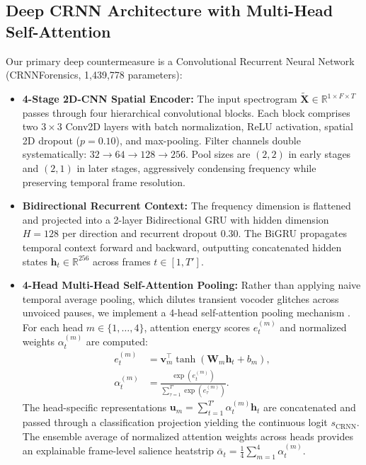 \documentclass[conference]{IEEEtran}
\begin{document}
\subsection{Deep CRNN Architecture with Multi-Head Self-Attention}
Our primary deep countermeasure is a Convolutional Recurrent Neural Network (CRNNForensics, 1,439,778 parameters):
\begin{itemize}
    \item \textbf{4-Stage 2D-CNN Spatial Encoder:} The input spectrogram $\tilde{\mathbf{X}} \in \mathbb{R}^{1 \times F \times T}$ passes through four hierarchical convolutional blocks. Each block comprises two $3 \times 3$ Conv2D layers with batch normalization, ReLU activation, spatial 2D dropout ($p=0.10$), and max-pooling. Filter channels double systematically: $32 \rightarrow 64 \rightarrow 128 \rightarrow 256$. Pool sizes are $(2, 2)$ in early stages and $(2, 1)$ in later stages, aggressively condensing frequency while preserving temporal frame resolution.
    \item \textbf{Bidirectional Recurrent Context:} The frequency dimension is flattened and projected into a 2-layer Bidirectional GRU with hidden dimension $H = 128$ per direction and recurrent dropout $0.30$. The BiGRU propagates temporal context forward and backward, outputting concatenated hidden states $\mathbf{h}_t \in \mathbb{R}^{256}$ across frames $t \in [1, T']$.
    \item \textbf{4-Head Multi-Head Self-Attention Pooling:} Rather than applying naive temporal average pooling, which dilutes transient vocoder glitches across unvoiced pauses, we implement a 4-head self-attention pooling mechanism \cite{vaswani2017attention}. For each head $m \in \{1,\dots,4\}$, attention energy scores $e_t^{(m)}$ and normalized weights $\alpha_t^{(m)}$ are computed:
    \begin{align}
    e_t^{(m)} &= \mathbf{v}_m^{\top} \tanh(\mathbf{W}_m \mathbf{h}_t + b_m), \\
    \alpha_t^{(m)} &= \frac{\exp(e_t^{(m)})}{\sum_{\tau=1}^{T'} \exp(e_\tau^{(m)})}.
    \end{align}
    The head-specific representations $\mathbf{u}_m = \sum_{t=1}^{T'} \alpha_t^{(m)} \mathbf{h}_t$ are concatenated and passed through a classification projection yielding the continuous logit $s_{\text{CRNN}}$. The ensemble average of normalized attention weights across heads provides an explainable frame-level salience heatstrip $\bar{\alpha}_t = \frac{1}{4}\sum_{m=1}^4 \alpha_t^{(m)}$.
\end{itemize}
\end{document}
